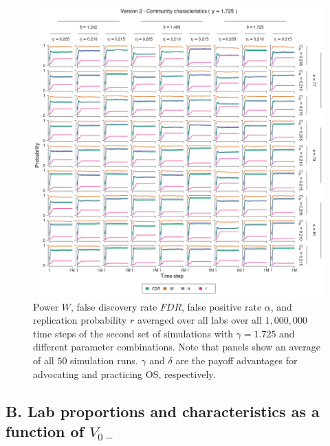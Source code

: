 \documentclass[meta, authordate,issue]{jote-new-article}
\begin{document}
\begin{figure}
  \begin{fullwidth}
    \centering
    \includegraphics[width=\textwidth]{v2_cha_plot_sens_payypro1.725.png}
    \caption{Power $W$, false discovery rate $FDR$, false positive rate $\alpha$, and replication probability $r$ averaged over all labs over all $1,000,000$ time steps of the second set of simulations with $\gamma=1.725$ and different parameter combinations. Note that panels show an average of all $50$ simulation runs. $\gamma$ and $\delta$ are the payoff advantages for advocating and practicing OS, respectively.}
    \label{fig:v2_cha_plot_sens_payypro1.725}
  \end{fullwidth}
\end{figure}
%

\clearpage
\subsection{B. Lab proportions and characteristics as a function of $V_{0-}$}\label{sec:appendix_b}
\end{document}
